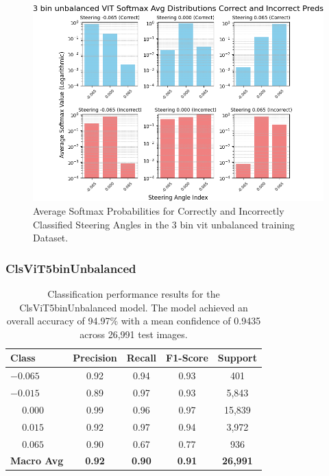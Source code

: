 \begin{figure}[H]
    \centering
    \includegraphics[width=1\linewidth]{Figures/Results/3_bins_vit_softmax_dist_plot_unbalanced.png}
    \caption{Average Softmax Probabilities for Correctly and Incorrectly Classified Steering Angles in the 3 bin vit unbalanced training Dataset.}
    \label{fig:3_bins_vit_softmax_dist_unbalanced}
\end{figure}


\subsubsection{ClsViT5binUnbalanced}

\begin{table}[htbp]
\centering
\begin{tabular}{@{}lcccc@{}}
\toprule
\textbf{Class} & \textbf{Precision} & \textbf{Recall} & \textbf{F1-Score} & \textbf{Support} \\
\midrule
$-0.065$ & 0.92 & 0.94 & 0.93 & 401 \\
$-0.015$ & 0.89 & 0.97 & 0.93 & 5,843 \\
$\phantom{-}0.000$ & 0.99 & 0.96 & 0.97 & 15,839 \\
$\phantom{-}0.015$ & 0.92 & 0.97 & 0.94 & 3,972 \\
$\phantom{-}0.065$ & 0.90 & 0.67 & 0.77 & 936 \\
\midrule
\textbf{Macro Avg} & \textbf{0.92} & \textbf{0.90} & \textbf{0.91} & \textbf{26,991} \\
\bottomrule
\end{tabular}
\caption{Classification performance results for the ClsViT5binUnbalanced model. The model achieved an overall accuracy of 94.97\% with a mean confidence of 0.9435 across 26,991 test images.}
\label{tab:clf_report_ClsViT5binUnbalanced}
\end{table}

